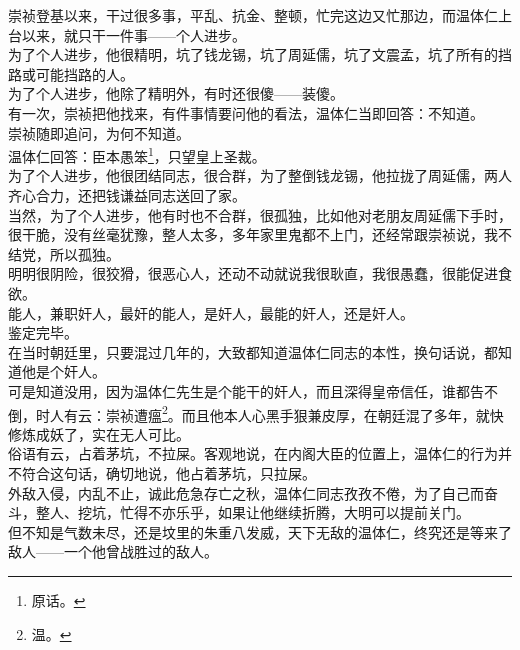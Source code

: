 \begin{multicols}{\theparacolNo}
崇祯登基以来，干过很多事，平乱、抗金、整顿，忙完这边又忙那边，而温体仁上台以来，就只干一件事——个人进步。\\

为了个人进步，他很精明，坑了钱龙锡，坑了周延儒，坑了文震孟，坑了所有的挡路或可能挡路的人。\\

为了个人进步，他除了精明外，有时还很傻——装傻。\\

有一次，崇祯把他找来，有件事情要问他的看法，温体仁当即回答：不知道。\\

崇祯随即追问，为何不知道。\\

温体仁回答：臣本愚笨\footnote{原话。}，只望皇上圣裁。\\

为了个人进步，他很团结同志，很合群，为了整倒钱龙锡，他拉拢了周延儒，两人齐心合力，还把钱谦益同志送回了家。\\

当然，为了个人进步，他有时也不合群，很孤独，比如他对老朋友周延儒下手时，很干脆，没有丝毫犹豫，整人太多，多年家里鬼都不上门，还经常跟崇祯说，我不结党，所以孤独。\\

明明很阴险，很狡猾，很恶心人，还动不动就说我很耿直，我很愚蠢，很能促进食欲。\\

能人，兼职奸人，最奸的能人，是奸人，最能的奸人，还是奸人。\\

鉴定完毕。\\

在当时朝廷里，只要混过几年的，大致都知道温体仁同志的本性，换句话说，都知道他是个奸人。\\

可是知道没用，因为温体仁先生是个能干的奸人，而且深得皇帝信任，谁都告不倒，时人有云：崇祯遭瘟\footnote{温。}。而且他本人心黑手狠兼皮厚，在朝廷混了多年，就快修炼成妖了，实在无人可比。\\

俗语有云，占着茅坑，不拉屎。客观地说，在内阁大臣的位置上，温体仁的行为并不符合这句话，确切地说，他占着茅坑，只拉屎。\\

外敌入侵，内乱不止，诚此危急存亡之秋，温体仁同志孜孜不倦，为了自己而奋斗，整人、挖坑，忙得不亦乐乎，如果让他继续折腾，大明可以提前关门。\\

但不知是气数未尽，还是坟里的朱重八发威，天下无敌的温体仁，终究还是等来了敌人——一个他曾战胜过的敌人。\\


\end{multicols}
